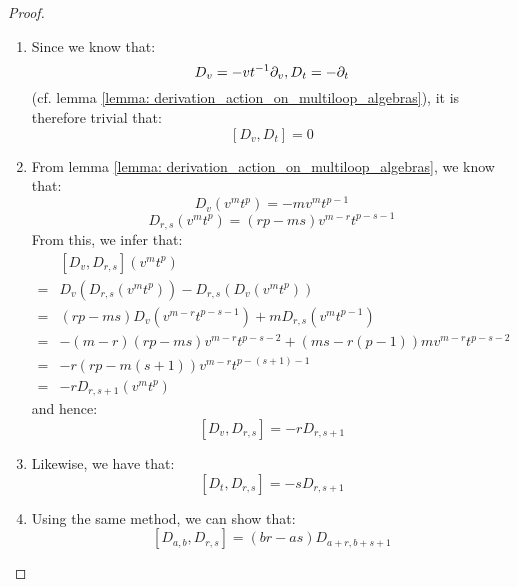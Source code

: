             \begin{proof}
                \begin{enumerate}
                    \item Since we know that:
                        $$D_v = -vt^{-1} \partial_v, D_t = -\partial_t$$
                    (cf. lemma \ref{lemma: derivation_action_on_multiloop_algebras}), it is therefore trivial that:
                        $$[D_v, D_t] = 0$$
                    \item From lemma \ref{lemma: derivation_action_on_multiloop_algebras}, we know that:
                        $$D_v(v^m t^p) = -m v^m t^{p - 1}$$
                        $$D_{r, s}(v^m t^p) = ( rp - ms ) v^{m - r} t^{p - s - 1}$$
                    From this, we infer that:
                        $$
                            \begin{aligned}
                                & [D_v, D_{r, s}](v^m t^p)
                                \\
                                = & D_v( D_{r, s}(v^m t^p) ) - D_{r, s}( D_v(v^m t^p) )
                                \\
                                = & (rp - ms) D_v( v^{m - r} t^{p - s - 1} ) + m D_{r, s}( v^m t^{p - 1} )
                                \\
                                = & -(m - r)(rp - ms) v^{m - r} t^{p - s - 2} + (ms - r(p - 1)) m v^{m - r} t^{p - s - 2}
                                \\
                                = & -r(rp - m(s + 1)) v^{m - r} t^{p - (s + 1) - 1}
                                \\
                                = & -r D_{r, s + 1}(v^m t^p)
                            \end{aligned}
                        $$
                    and hence:
                        $$[D_v, D_{r, s}] = -r D_{r, s + 1}$$
                    \item Likewise, we have that:
                        $$[D_t, D_{r, s}] = -s D_{r, s + 1}$$
                    \item Using the same method, we can show that:
                        $$[D_{a, b}, D_{r, s}] = (br - as) D_{a + r, b + s + 1}$$
                \end{enumerate}
            \end{proof}

